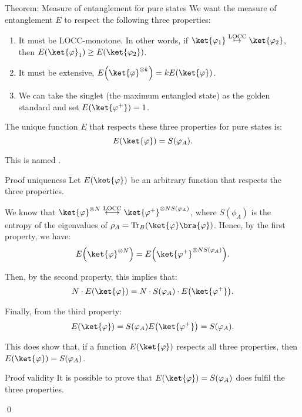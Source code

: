 \documentclass[a4paper]{article}
\begin{document}
\begin{parag}{Theorem: Measure of entanglement for pure states}
    We want the measure of entanglement $E$ to respect the following three properties:
    \begin{enumerate}
        \item It must be LOCC-monotone. In other words, if $\ket{\phi_1} \over{\mapsto}{LOCC} \ket{\phi_2}$, then $E\left(\ket{\phi}_1\right) \geq E\left(\ket{\phi_2}\right)$.
        \item It must be extensive, $E\left(\ket{\phi}^{\otimes k}\right) = k E\left(\ket{\phi}\right)$.
        \item We can take the singlet (the maximum entangled state) as the golden standard and set $E\left(\ket{\phi^+}\right) = 1$.
    \end{enumerate}

    The unique function $E$ that respects these three properties for pure states is:
    \[E\left(\ket{\phi}\right) = S\left(\phi_A\right).\]

    This is named .

    \begin{subparag}{Proof uniqueness}
        Let $E\left(\ket{\phi}\right)$ be an arbitrary function that respects the three properties. 

        We know that $\ket{\phi}^{\otimes N} \over{\longleftrightarrow}{LOCC} \ket{\phi^+}^{\otimes NS\left(\phi_A\right)}$, where $S\left(\phi_A\right)$ is the entropy of the eigenvalues of $\rho_A = \Tr_B\left(\ket{\phi}\bra{\phi}\right)$. Hence, by the first property, we have:
        \[E\left(\ket{\phi}^{\otimes N}\right) = E\left(\ket{\phi^+}^{\otimes N S\left(\phi_A\right)}\right).\]

        Then, by the second property, this implies that: 
        \[N\cdot  E\left(\ket{\phi}\right) = N \cdot S\left(\phi_A\right) \cdot E\left(\ket{\phi^+}\right).\]

        Finally, from the third property: 
        \[E\left(\ket{\phi}\right) = S\left(\phi_A\right) E\left(\ket{\phi^+}\right) = S\left(\phi_A\right).\]

        This does show that, if a function $E\left(\ket{\phi}\right)$ respects all three properties, then $E\left(\ket{\phi}\right) = S\left(\phi_A\right)$.
    \end{subparag}

    \begin{subparag}{Proof validity}
        It is possible to prove that $E\left(\ket{\phi}\right) = S\left(\phi_A\right)$ does fulfil the three properties.
        
        \qed
    \end{subparag}
\end{parag}
\end{document}
